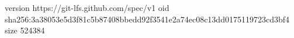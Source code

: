 version https://git-lfs.github.com/spec/v1
oid sha256:3a38053e5d3f81c5b87408bbedd92f3541e2a74ec08c13dd0175119723cd3bf4
size 524384
